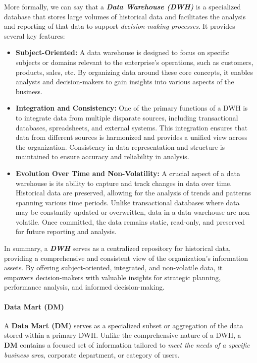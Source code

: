 More formally, we can say that a \textbf{\textit{Data Warehouse (DWH)}} is a specialized database that stores large volumes of historical data and facilitates the analysis and reporting of that data to support \textit{decision-making processes}. It provides several key features:

\begin{itemize}
    \item \textbf{Subject-Oriented:} A data warehouse is designed to focus on specific subjects or domains relevant to the enterprise's operations, such as customers, products, sales, etc. By organizing data around these core concepts, it enables analysts and decision-makers to gain insights into various aspects of the business.

    \item \textbf{Integration and Consistency:} One of the primary functions of a DWH is to integrate data from multiple disparate sources, including transactional databases, spreadsheets, and external systems. This integration ensures that data from different sources is harmonized and provides a unified view across the organization. Consistency in data representation and structure is maintained to ensure accuracy and reliability in analysis.

    \item \textbf{Evolution Over Time and Non-Volatility:} A crucial aspect of a data warehouse is its ability to capture and track changes in data over time. Historical data are preserved, allowing for the analysis of trends and patterns spanning various time periods. Unlike transactional databases where data may be constantly updated or overwritten, data in a data warehouse are non-volatile. Once committed, the data remains static, read-only, and preserved for future reporting and analysis.

\end{itemize}

In summary, a \textbf{\textit{DWH}} serves as a centralized repository for historical data, providing a comprehensive and consistent view of the organization's information assets. By offering subject-oriented, integrated, and non-volatile data, it empowers decision-makers with valuable insights for strategic planning, performance analysis, and informed decision-making.

\paragraph{Data Mart (DM)}
A \textbf{Data Mart (DM)} serves as a specialized subset or aggregation of the data stored within a primary DWH. Unlike the comprehensive nature of a DWH, a \textbf{DM} contains a focused set of information tailored to \textit{meet the needs of a specific business area}, corporate department, or category of users.

